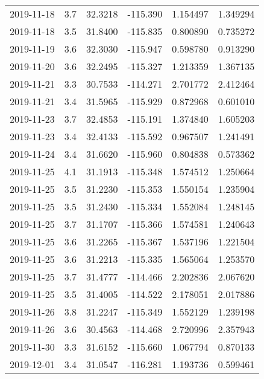\begin{tabular}{lrrrrr}
2019-11-18 &       3.7 &  32.3218 &  -115.390 &         1.154497 &         1.349294 \\
2019-11-18 &       3.5 &  31.8400 &  -115.835 &         0.800890 &         0.735272 \\
2019-11-19 &       3.6 &  32.3030 &  -115.947 &         0.598780 &         0.913290 \\
2019-11-20 &       3.6 &  32.2495 &  -115.327 &         1.213359 &         1.367135 \\
2019-11-21 &       3.3 &  30.7533 &  -114.271 &         2.701772 &         2.412464 \\
2019-11-21 &       3.4 &  31.5965 &  -115.929 &         0.872968 &         0.601010 \\
2019-11-23 &       3.7 &  32.4853 &  -115.191 &         1.374840 &         1.605203 \\
2019-11-23 &       3.4 &  32.4133 &  -115.592 &         0.967507 &         1.241491 \\
2019-11-24 &       3.4 &  31.6620 &  -115.960 &         0.804838 &         0.573362 \\
2019-11-25 &       4.1 &  31.1913 &  -115.348 &         1.574512 &         1.250664 \\
2019-11-25 &       3.5 &  31.2230 &  -115.353 &         1.550154 &         1.235904 \\
2019-11-25 &       3.5 &  31.2430 &  -115.334 &         1.552084 &         1.248145 \\
2019-11-25 &       3.7 &  31.1707 &  -115.366 &         1.574581 &         1.240643 \\
2019-11-25 &       3.6 &  31.2265 &  -115.367 &         1.537196 &         1.221504 \\
2019-11-25 &       3.6 &  31.2213 &  -115.335 &         1.565064 &         1.253570 \\
2019-11-25 &       3.7 &  31.4777 &  -114.466 &         2.202836 &         2.067620 \\
2019-11-25 &       3.5 &  31.4005 &  -114.522 &         2.178051 &         2.017886 \\
2019-11-26 &       3.8 &  31.2247 &  -115.349 &         1.552129 &         1.239198 \\
2019-11-26 &       3.6 &  30.4563 &  -114.468 &         2.720996 &         2.357943 \\
2019-11-30 &       3.3 &  31.6152 &  -115.660 &         1.067794 &         0.870133 \\
2019-12-01 &       3.4 &  31.0547 &  -116.281 &         1.193736 &         0.599461 \\

\end{tabular}
